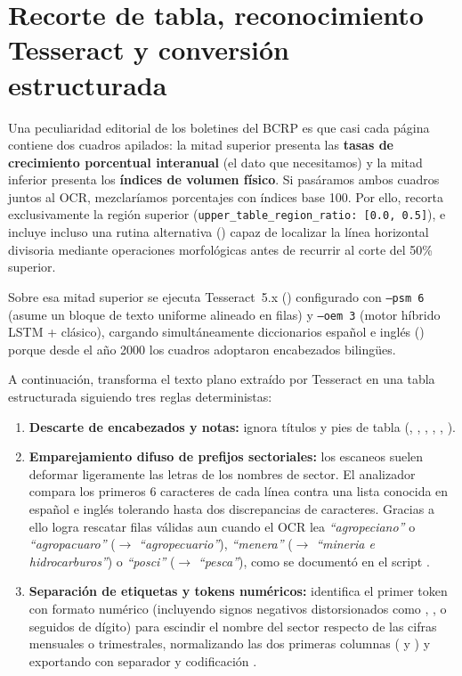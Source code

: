 \documentclass[12pt,letterpaper]{article}
\begin{document}
\section{Recorte de tabla, reconocimiento Tesseract y conversión estructurada}

Una peculiaridad editorial de los boletines del BCRP es que casi cada página contiene dos cuadros apilados: la mitad superior presenta las \textbf{tasas de crecimiento porcentual interanual} (el dato que necesitamos) y la mitad inferior presenta los \textbf{índices de volumen físico}. Si pasáramos ambos cuadros juntos al OCR, mezclaríamos porcentajes con índices base 100. Por ello,  recorta exclusivamente la región superior (\texttt{upper\_table\_region\_ratio: [0.0, 0.5]}), e incluye incluso una rutina alternativa () capaz de localizar la línea horizontal divisoria mediante operaciones morfológicas antes de recurrir al corte del 50\% superior.

Sobre esa mitad superior se ejecuta Tesseract~5.x () configurado con \texttt{--psm 6} (asume un bloque de texto uniforme alineado en filas) y \texttt{--oem 3} (motor híbrido LSTM + clásico), cargando simultáneamente diccionarios español e inglés () porque desde el año 2000 los cuadros adoptaron encabezados bilingües.

A continuación,  transforma el texto plano extraído por Tesseract en una tabla estructurada siguiendo tres reglas deterministas:
\begin{enumerate}
  \item \textbf{Descarte de encabezados y notas:} ignora títulos y pies de tabla (, , , , , ).
  \item \textbf{Emparejamiento difuso de prefijos sectoriales:} los escaneos suelen deformar ligeramente las letras de los nombres de sector. El analizador compara los primeros \(6\) caracteres de cada línea contra una lista conocida en español e inglés tolerando hasta dos discrepancias de caracteres. Gracias a ello logra rescatar filas válidas aun cuando el OCR lea \textit{``agropeciano''} o \textit{``agropacuaro''} (\(\to\) \textit{``agropecuario''}), \textit{``menera''} (\(\to\) \textit{``mineria e hidrocarburos''}) o \textit{``posci''} (\(\to\) \textit{``pesca''}), como se documentó en el script .
  \item \textbf{Separación de etiquetas y tokens numéricos:} identifica el primer token con formato numérico (incluyendo signos negativos distorsionados como \codigo{-}, , \codigo{=} o \codigo{~} seguidos de dígito) para escindir el nombre del sector respecto de las cifras mensuales o trimestrales, normalizando las dos primeras columnas ( y ) y exportando con separador \codigo{;} y codificación .
\end{enumerate}
\end{document}
